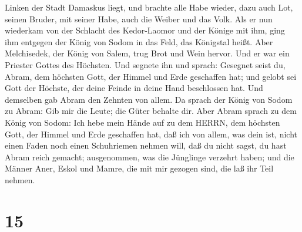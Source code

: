 Linken der Stadt Damaskus liegt,  und brachte alle Habe
wieder, dazu auch Lot, seinen Bruder, mit seiner Habe, auch die Weiber
und das Volk.  Als er nun wiederkam von der Schlacht des
Kedor-Laomor und der Könige mit ihm, ging ihm entgegen der König von
Sodom in das Feld, das Königstal heißt.  Aber Melchisedek,
der König von Salem, trug Brot und Wein hervor. Und er war ein Priester
Gottes des Höchsten.  Und segnete ihn und sprach: Gesegnet
seist du, Abram, dem höchsten Gott, der Himmel und Erde geschaffen hat;
 und gelobt sei Gott der Höchste, der deine Feinde in deine
Hand beschlossen hat. Und demselben gab Abram den Zehnten von allem.
 Da sprach der König von Sodom zu Abram: Gib mir die Leute;
die Güter behalte dir.  Aber Abram sprach zu dem König von
Sodom: Ich hebe mein Hände auf zu dem HERRN, dem höchsten Gott, der
Himmel und Erde geschaffen hat,  daß ich von allem, was
dein ist, nicht einen Faden noch einen Schuhriemen nehmen will, daß du
nicht sagst, du hast Abram reich gemacht;  ausgenommen, was
die Jünglinge verzehrt haben; und die Männer Aner, Eskol und Mamre, die
mit mir gezogen sind, die laß ihr Teil nehmen.

\hypertarget{section-14}{%
\section{15}\label{section-14}}

